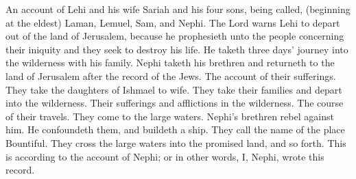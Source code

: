 \subtitle{HIS REIGN AND MINISTRY} %

An account of Lehi and his wife Sariah and his four sons, being called, (beginning at the eldest) Laman, Lemuel, Sam, and Nephi.  The Lord warns Lehi to depart out of the land of Jerusalem, because he prophesieth unto the people concerning their iniquity and they seek to destroy his life. He taketh three days' journey into the wilderness with his family. Nephi taketh his brethren and returneth to the land of Jerusalem after the record of the Jews. The account of their sufferings. They take the daughters of Ishmael to wife. They take their families and depart into the wilderness. Their sufferings and afflictions in the wilderness.  The course of their travels. They come to the large waters.  Nephi's brethren rebel against him. He confoundeth them, and buildeth a ship. They call the name of the place Bountiful. They cross the large waters into the promised land, and so forth. This is according to the account of Nephi; or in other words, I, Nephi, wrote this record.

